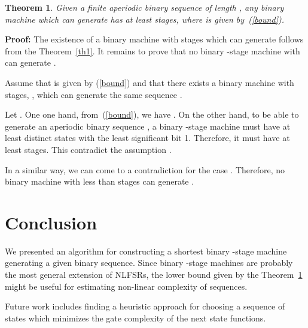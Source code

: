 \documentclass[twocolumn]{IEEEtran} \usepackage{epsfig}
\newtheorem{theorem}{Theorem}
\begin{document}
\begin{theorem} \label{th2}
Given a finite aperiodic binary sequence  of length , any 
binary machine which can generate   has at least  stages, where
 is given by~(\ref{bound}).
\end{theorem}
{\bf Proof:} 
The existence of a binary machine with  stages which can generate 
follows from the Theorem~\ref{th1}.  
It remains to prove that no binary -stage machine with  can generate .

Assume that  is given by (\ref{bound}) and that there exists a binary machine with  
 stages, , which can generate the same sequence . 

Let . One one hand, from~(\ref{bound}), we have .
On the other hand, to be able to generate an aperiodic binary sequence , a binary -stage machine 
must have at least  distinct states with the least significant bit 1. Therefore, it must have at least 
 stages. This contradict the assumption .

In a similar way, we can come to a contradiction for the case  .
Therefore, no binary machine with less than  stages can generate .
\begin{flushright}

\end{flushright}



\section{Conclusion}

We presented an algorithm for constructing a shortest binary
-stage machine generating a given binary sequence. 
Since binary -stage machines are probably the most general extension of NLFSRs,
the lower bound given by the Theorem~\ref{th2} might be useful for estimating non-linear 
complexity of sequences. 

Future work includes finding a heuristic approach for choosing a sequence of states which 
minimizes the gate complexity of the next state functions.






\end{document}
